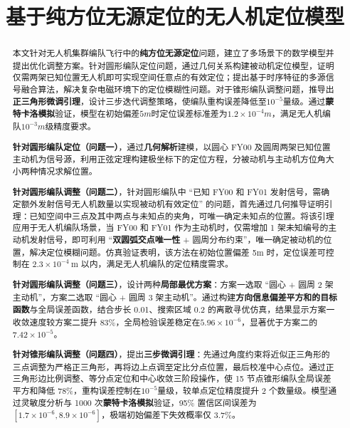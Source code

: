 \documentclass[withoutpreface,bwprint]{cumcmthesis} %
\title{基于纯方位无源定位的无人机定位模型}
\begin{document}
\maketitle
\nocite{*}


\begin{abstract}
本文针对无人机集群编队飞行中的\textbf{纯方位无源定位}问题，建立了多场景下的数学模型并提出优化调整方案。针对圆形编队定位问题，通过几何关系构建被动机定位模型，证明仅需两架已知位置无人机即可实现空间任意点的有效定位；提出基于时序特征的多源信号融合算法，解决复杂电磁环境下的定位模糊性问题。对于锥形编队调整问题，推导出\textbf{正三角形微调引理}，设计三步迭代调整策略，使编队重构误差降低至$10^{−5}$量级。通过\textbf{蒙特卡洛模拟}验证，模型在初始偏差$5m$时定位误差标准差为$1.2×10^{−4}m$，满足无人机编队$10^{−3}m$级精度要求。

    \textbf{针对圆形编队定位（问题一）}，通过\textbf{几何解析}建模，以圆心 FY00 及圆周两架已知位置主动机为信号源，利用正弦定理构建极坐标下的定位方程，分被动机与主动机方位角大小两种情况求解位置。

    \textbf{针对圆形编队调整（问题二）}，针对圆形编队中 “已知 FY00 和 FY01 发射信号，需确定额外发射信号无人机数量以实现被动机有效定位” 的问题，首先通过几何推导证明引理：已知空间中三点及其中两点与未知点的夹角，可唯一确定未知点的位置。将该引理应用于无人机编队场景，当 FY00 和 FY01 作为主动机时，仅需增加 1 架未知编号的主动机发射信号，即可利用 “\textbf{双圆弧交点唯一性} + 圆周分布约束”，唯一确定被动机的位置，解决定位模糊问题。仿真验证表明，该方法在初始位置偏差 5m 时，定位误差可控制在 $2.3×10^{-4}\ \text{m}$ 以内，满足无人机编队的定位精度需求。

    \textbf{针对圆形编队调整（问题三）}，设计两种\textbf{局部最优方案}：方案一选取 “圆心 + 圆周 2 架主动机”，方案二选取 “圆心 + 圆周 3 架主动机”。通过构建\textbf{方向信息偏差平方和的目标函数}与全局误差函数，结合步长 0.01、搜索区域 0.2 的离散寻优仿真，结果显示方案一收敛速度较方案二提升 83\%，全局检验误差稳定在$5.96×10^{−6}$，显著优于方案二的$7.42×10^{−5}$。

    \textbf{针对锥形编队调整（问题四）}，提出\textbf{三步微调引理}：先通过角度约束将近似正三角形的三点调整为严格正三角形，再将边上点调至定比分点位置，最后校准中心点位。通过正三角形边比例调整、等分点定位和中心收敛三阶段操作，使 15 节点锥形编队全局误差平方和降低 78\%，重构误差控制在$10^{−5}$量级，较单点定位精度提升 2 个数量级。模型通过灵敏度分析与 1000 次\textbf{蒙特卡洛模拟}验证，95\% 置信区间误差为$[1.7×10^{−6},8.9×10^{−6}]$，极端初始偏差下失效概率仅 3.7\%。



\end{abstract}
\end{document}
